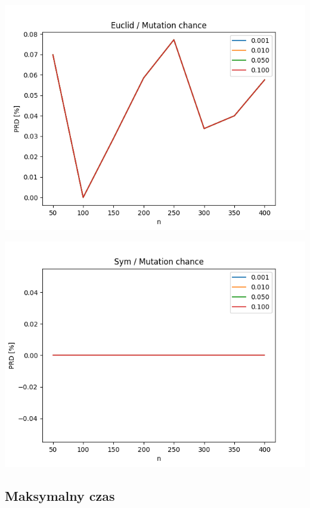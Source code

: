 \documentclass{article}
\begin{document}
\begin{center}
\includegraphics[width=\textwidth, 
                   height = 0.4\textheight, 
                   keepaspectratio]
                  {plots/euclid_8_mut_chance} 
\end{center}

\begin{center}
\includegraphics[width=\textwidth, 
                   height = 0.4\textheight, 
                   keepaspectratio]
                  {plots/sym_8_mut_chance} 
\end{center}


\subsection{Maksymalny czas}
\end{document}
